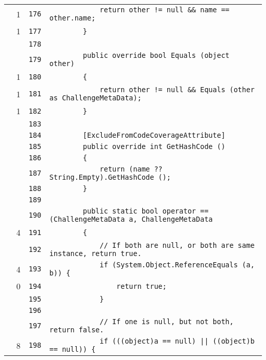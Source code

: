 \documentclass[a4paper,10pt]{article}
\begin{document}
\begin{longtable}[l]{lrrl}
\cellcolor{green} & 1 & \verb~176~ & \verb~            return other != null && name == other.name;~\\
\cellcolor{green} & 1 & \verb~177~ & \verb~        }~\\
\cellcolor{gray} &  & \verb~178~ & \verb~~\\
\cellcolor{gray} &  & \verb~179~ & \verb~        public override bool Equals (object other)~\\
\cellcolor{green} & 1 & \verb~180~ & \verb~        {~\\
\cellcolor{green} & 1 & \verb~181~ & \verb~            return other != null && Equals (other as ChallengeMetaData);~\\
\cellcolor{green} & 1 & \verb~182~ & \verb~        }~\\
\cellcolor{gray} &  & \verb~183~ & \verb~~\\
\cellcolor{gray} &  & \verb~184~ & \verb~        [ExcludeFromCodeCoverageAttribute]~\\
\cellcolor{gray} &  & \verb~185~ & \verb~        public override int GetHashCode ()~\\
\cellcolor{gray} &  & \verb~186~ & \verb~        {~\\
\cellcolor{gray} &  & \verb~187~ & \verb~            return (name ?? String.Empty).GetHashCode ();~\\
\cellcolor{gray} &  & \verb~188~ & \verb~        }~\\
\cellcolor{gray} &  & \verb~189~ & \verb~~\\
\cellcolor{gray} &  & \verb~190~ & \verb~        public static bool operator == (ChallengeMetaData a, ChallengeMetaData~\\
\cellcolor{green} & 4 & \verb~191~ & \verb~        {~\\
\cellcolor{gray} &  & \verb~192~ & \verb~            // If both are null, or both are same instance, return true.~\\
\cellcolor{green} & 4 & \verb~193~ & \verb~            if (System.Object.ReferenceEquals (a, b)) {~\\
\cellcolor{red} & 0 & \verb~194~ & \verb~                return true;~\\
\cellcolor{gray} &  & \verb~195~ & \verb~            }~\\
\cellcolor{gray} &  & \verb~196~ & \verb~~\\
\cellcolor{gray} &  & \verb~197~ & \verb~            // If one is null, but not both, return false.~\\
\cellcolor{green} & 8 & \verb~198~ & \verb~            if (((object)a == null) || ((object)b == null)) {~\\

\end{longtable}
\end{document}
